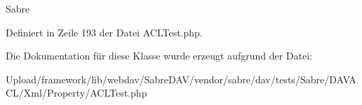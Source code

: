 Sabre 

Definiert in Zeile 193 der Datei A\+C\+L\+Test.\+php.



Die Dokumentation für diese Klasse wurde erzeugt aufgrund der Datei\+:\begin{DoxyCompactItemize}
\item 
Upload/framework/lib/webdav/\+Sabre\+D\+A\+V/vendor/sabre/dav/tests/\+Sabre/\+D\+A\+V\+A\+C\+L/\+Xml/\+Property/A\+C\+L\+Test.\+php\end{DoxyCompactItemize}
